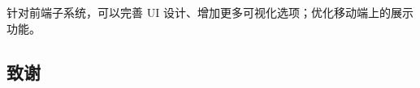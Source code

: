 \documentclass[a4paper,AutoFakeBold,oneside,12pt]{book}
\begin{document}
针对前端子系统，可以完善 UI 设计、增加更多可视化选项；优化移动端上的展示功能。


\begin{nopagenumber}
	\clearpage{}
	

	\clearpage
	\chapter{致\qquad{}谢}
	\normalsize\thankwords

\end{nopagenumber}

\blankmatter



\blankmatter

\end{document}
